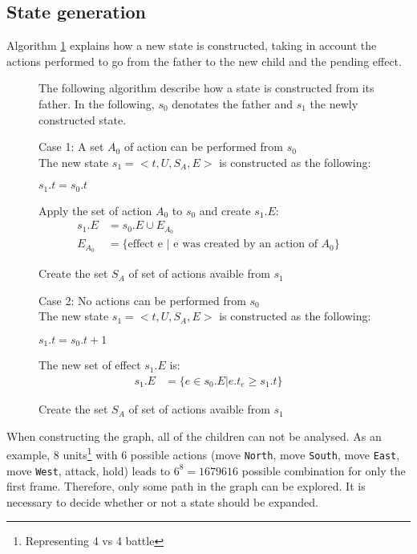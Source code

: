 \subsection{State generation}

Algorithm \ref{algGeneration} explains how a new state is constructed, taking in account the actions performed to go from the father to the new child and the pending effect.

\begin{figure}[h!t]
\begin{algorithm}
The following algorithm describe how a state is constructed from its father.
In the following, $s_0$ denotates the father and $s_1$ the newly constructed state.

\begin{descri} 

\item[Case 1: A set $A_0$  of action can be performed from $s_0$]
\ \\
The new state $s_1=<t,U,S_A,E>$ is constructed as the following:
\begin{shortitem}
\item $s_1.t = s_0.t$ 
\item Apply the set of action $A_0$ to $s_0$ and create $s_1.E$:
\begin{align*}
s_1.E &= s_0.E \cup E_{A_0} \\
E_{A_0} &= \{\text{effect e | e was created by an action of } A_0\}  
\end{align*}
\item Create the set $S_{A}$ of set of actions avaible from $s_1$
\end{shortitem}
\item[Case 2: No actions can be performed from $s_0$]
\ \\
The new state $s_1 = <t,U,S_A,E>$ is constructed as the following:
\begin{shortitem}
\item $s_1.t = s_0.t + 1$
\item The new set of effect $s_1.E$ is:
\begin{align*}
s_1.E &= \{e \in s_0.E | e.t_e \geq s_1.t\}
\end{align*}
\item Create the set $S_{A}$ of set of actions avaible from $s_1$
\end{shortitem}
\end{descri}
\label{algGeneration}
\end{algorithm}
\end{figure}
When constructing the graph, all of the children can not be analysed. 
As an example, 8 units\footnote{Representing 4 vs 4 battle} with 6 possible actions (move \texttt{North}, move \texttt{South}, move \texttt{East}, move \texttt{West}, attack, hold) leads to $6^8 = 1679616$ possible combination for only the first frame. 
Therefore, only some path in the graph can be explored.
It is necessary to decide whether or not a state should be expanded.

